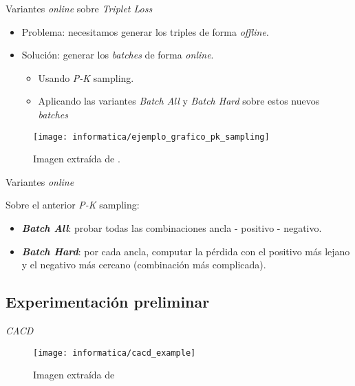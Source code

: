 \begin{frame}{Variantes \textit{online} sobre \textit{Triplet Loss}}

	\begin{itemize}
		\item Problema: necesitamos generar los triples de forma \textit{offline}.
		\item Solución: generar los \textit{batches} de forma \textit{online}.
		      \begin{itemize}
			      \item Usando \textit{P-K} sampling.
			      \item Aplicando las variantes \textit{Batch All} y \textit{Batch Hard} sobre estos nuevos \textit{batches}
		      \end{itemize}
	\end{itemize}

	\begin{figure}
		\texttt{[image: informatica/ejemplo\_grafico\_pk\_sampling]}
		\caption{Imagen extraída de \cite{informatica:paper_image_pk_sampling}.}
	\end{figure}

\end{frame}

\begin{frame}{Variantes \textit{online}}

	Sobre el anterior \textit{P-K} sampling:

	\begin{itemize}
		\item \textbf{\textit{Batch All}}: probar todas las combinaciones ancla - positivo - negativo.
		\item \textbf{\textit{Batch Hard}}: por cada ancla, computar la pérdida con el positivo más lejano y el negativo más cercano (combinación más complicada).
	\end{itemize}

\end{frame}

\subsection{Experimentación preliminar}
\begin{frame}{\textit{CACD}}

	\begin{figure}
		\texttt{[image: informatica/cacd\_example]}
		\caption{Imagen extraída de \cite{informatica:paper_cacd}}
		\label{img:cacd_imagenes_ejemplo}
	\end{figure}

\end{frame}

